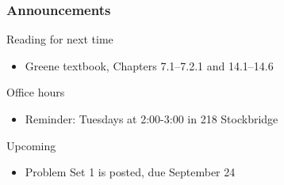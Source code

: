\documentclass{beamer}
\begin{document}
\begin{frame}\frametitle{Announcements}
    Reading for next time
    \begin{itemize}
        \item Greene textbook, Chapters 7.1--7.2.1 and 14.1--14.6
    \end{itemize}
    \vspace{3ex}
    Office hours
    \begin{itemize}
    	\item Reminder: Tuesdays at 2:00-3:00 in 218 Stockbridge
    \end{itemize}
    \vspace{3ex}
    Upcoming
    \begin{itemize}
        \item Problem Set 1 is posted, due September 24
    \end{itemize}
\end{frame}
\end{document}

